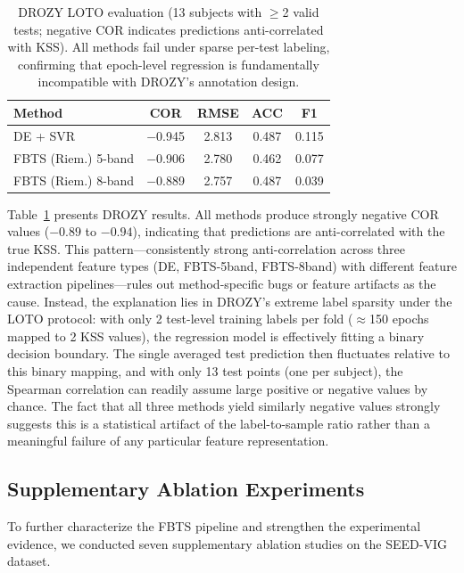 \documentclass{iopjournal}
\begin{document}
\begin{table}
\caption{DROZY LOTO evaluation (13 subjects with $\geq$2 valid tests; negative COR indicates predictions anti-correlated with KSS). All methods fail under sparse per-test labeling, confirming that epoch-level regression is fundamentally incompatible with DROZY's annotation design.}
\centering
\begin{tabular}{lcccc}
\toprule
\textbf{Method} & \textbf{COR} & \textbf{RMSE} & \textbf{ACC} & \textbf{F1} \\
\midrule
DE + SVR       & $-$0.945 & 2.813 & 0.487 & 0.115 \\
FBTS (Riem.) 5-band & $-$0.906 & 2.780 & 0.462 & 0.077 \\
FBTS (Riem.) 8-band & $-$0.889 & 2.757 & 0.487 & 0.039 \\
\bottomrule
\end{tabular}
\label{tab:drozy}
\end{table}

Table~\ref{tab:drozy} presents DROZY results. All methods produce strongly negative COR values ($-0.89$ to $-0.94$), indicating that predictions are anti-correlated with the true KSS. This pattern---consistently strong anti-correlation across three independent feature types (DE, FBTS-5band, FBTS-8band) with different feature extraction pipelines---rules out method-specific bugs or feature artifacts as the cause. Instead, the explanation lies in DROZY's extreme label sparsity under the LOTO protocol: with only 2 test-level training labels per fold ($\approx$150 epochs mapped to 2 KSS values), the regression model is effectively fitting a binary decision boundary. The single averaged test prediction then fluctuates relative to this binary mapping, and with only 13 test points (one per subject), the Spearman correlation can readily assume large positive or negative values by chance. The fact that all three methods yield similarly negative values strongly suggests this is a statistical artifact of the label-to-sample ratio rather than a meaningful failure of any particular feature representation.

\subsection{Supplementary Ablation Experiments}
\label{sec:supp-ablation}

To further characterize the FBTS pipeline and strengthen the experimental evidence, we conducted seven supplementary ablation studies on the SEED-VIG dataset.
\end{document}
